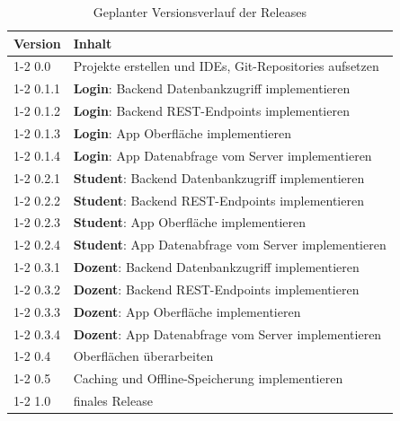 \begin{table}[H]
\begin{tabular}{l|p{12cm}}
\textbf{Version} & \textbf{Inhalt} \\ \cline{1-2}
0.0 & Projekte erstellen und IDEs, Git-Repositories aufsetzen \\ \cline{1-2}
0.1.1 & \textbf{Login}: Backend Datenbankzugriff implementieren \\ \cline{1-2}
0.1.2 & \textbf{Login}: Backend REST-Endpoints implementieren \\ \cline{1-2}
0.1.3 & \textbf{Login}: App Oberfläche implementieren \\ \cline{1-2}
0.1.4 & \textbf{Login}: App Datenabfrage vom Server implementieren \\ \cline{1-2}
0.2.1 & \textbf{Student}: Backend Datenbankzugriff implementieren \\ \cline{1-2}
0.2.2 & \textbf{Student}: Backend REST-Endpoints implementieren \\ \cline{1-2}
0.2.3 & \textbf{Student}: App Oberfläche implementieren \\ \cline{1-2}
0.2.4 & \textbf{Student}: App Datenabfrage vom Server implementieren \\ \cline{1-2}
0.3.1 & \textbf{Dozent}: Backend Datenbankzugriff implementieren \\ \cline{1-2}
0.3.2 & \textbf{Dozent}: Backend REST-Endpoints implementieren \\ \cline{1-2}
0.3.3 & \textbf{Dozent}: App Oberfläche implementieren \\ \cline{1-2}
0.3.4 & \textbf{Dozent}: App Datenabfrage vom Server implementieren \\ \cline{1-2}
0.4 & Oberflächen überarbeiten \\ \cline{1-2}
0.5 & Caching und Offline-Speicherung implementieren \\ \cline{1-2}
1.0 & finales Release
\end{tabular}
\caption{Geplanter Versionsverlauf der Releases}
\label{table:releaseplanung}
\end{table}

